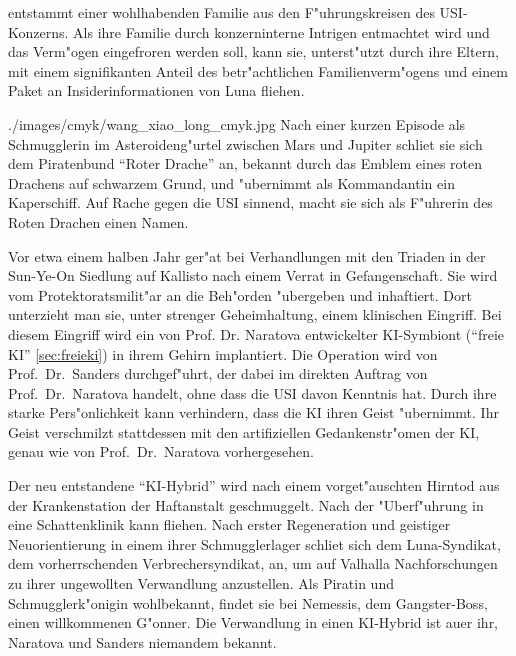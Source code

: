 \newpage
{}

\xls{} entstammt einer wohlhabenden Familie aus den F"uhrungskreisen des USI-Konzerns. Als ihre Familie durch konzerninterne Intrigen entmachtet wird und das Verm"ogen eingefroren werden soll, kann sie, unterst"utzt durch ihre Eltern, mit einem signifikanten Anteil des betr"achtlichen Familienverm"ogens und einem Paket an Insiderinformationen von Luna fliehen.

\begin{sideimagebox}[r]{0.64}{./images/cmyk/wang_xiao_long_cmyk.jpg}{}
    Nach einer kurzen Episode als Schmugglerin im Asteroideng"urtel zwischen Mars und Jupiter schlie\3t sie sich dem Piratenbund ``Roter Drache'' an, bekannt durch das Emblem eines roten Drachens auf schwarzem Grund, und "ubernimmt als Kommandantin ein Kaperschiff. Auf Rache gegen die USI sinnend, macht sie sich als F"uhrerin des Roten Drachen einen Namen.

    Vor etwa einem halben Jahr ger"at \xls{} bei Verhandlungen mit den Triaden in der Sun-Ye-On Siedlung auf Kallisto nach einem Verrat in Gefangenschaft. Sie wird vom Protektoratsmilit"ar an die Beh"orden "ubergeben und inhaftiert. Dort unterzieht man sie, unter strenger Geheimhaltung, einem klinischen Eingriff. Bei diesem Eingriff wird ein von Prof. Dr. Naratova entwickelter KI-Symbiont (``freie KI'' \cref{sec:freieki}) in ihrem Gehirn implantiert. Die Operation wird von Prof.~Dr.~Sanders durchgef"uhrt, der dabei im direkten Auftrag von Prof.~Dr.~Naratova handelt, ohne dass die USI davon Kenntnis hat. Durch ihre starke Pers"onlichkeit kann \xls{} verhindern, dass die KI ihren Geist "ubernimmt. Ihr Geist verschmilzt stattdessen mit den artifiziellen Gedankenstr"omen der KI, genau wie von Prof.~Dr.~Naratova vorhergesehen.
\end{sideimagebox}

Der neu entstandene ``KI-Hybrid'' wird nach einem vorget"auschten Hirntod aus der Krankenstation der Haftanstalt geschmuggelt. Nach der "Uberf"uhrung in eine Schattenklinik kann \xl{} fliehen. Nach erster Regeneration und geistiger Neuorientierung in einem ihrer Schmugglerlager schlie\3t sich \xl{} dem Luna-Syndikat, dem vorherrschenden Verbrechersyndikat, an, um auf Valhalla Nachforschungen zu ihrer ungewollten Verwandlung anzustellen. Als Piratin und Schmugglerk"onigin wohlbekannt, findet sie bei Nemessis, dem Gangster-Boss, einen willkommenen G"onner. Die Verwandlung in einen KI-Hybrid ist au\3er ihr, Naratova und Sanders niemandem bekannt.

